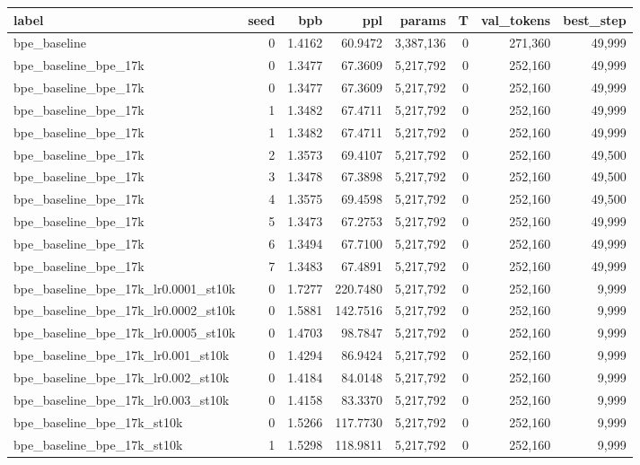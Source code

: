 \begin{tabular}{lrrrrrrr}
\toprule
label & seed & bpb & ppl & params & T & val_tokens & best_step \\
\midrule
bpe\_baseline & 0 & 1.4162 & 60.9472 & 3,387,136 & 0 & 271,360 & 49,999 \\
bpe\_baseline\_bpe\_17k & 0 & 1.3477 & 67.3609 & 5,217,792 & 0 & 252,160 & 49,999 \\
bpe\_baseline\_bpe\_17k & 0 & 1.3477 & 67.3609 & 5,217,792 & 0 & 252,160 & 49,999 \\
bpe\_baseline\_bpe\_17k & 1 & 1.3482 & 67.4711 & 5,217,792 & 0 & 252,160 & 49,999 \\
bpe\_baseline\_bpe\_17k & 1 & 1.3482 & 67.4711 & 5,217,792 & 0 & 252,160 & 49,999 \\
bpe\_baseline\_bpe\_17k & 2 & 1.3573 & 69.4107 & 5,217,792 & 0 & 252,160 & 49,500 \\
bpe\_baseline\_bpe\_17k & 3 & 1.3478 & 67.3898 & 5,217,792 & 0 & 252,160 & 49,500 \\
bpe\_baseline\_bpe\_17k & 4 & 1.3575 & 69.4598 & 5,217,792 & 0 & 252,160 & 49,500 \\
bpe\_baseline\_bpe\_17k & 5 & 1.3473 & 67.2753 & 5,217,792 & 0 & 252,160 & 49,999 \\
bpe\_baseline\_bpe\_17k & 6 & 1.3494 & 67.7100 & 5,217,792 & 0 & 252,160 & 49,999 \\
bpe\_baseline\_bpe\_17k & 7 & 1.3483 & 67.4891 & 5,217,792 & 0 & 252,160 & 49,999 \\
bpe\_baseline\_bpe\_17k\_lr0.0001\_st10k & 0 & 1.7277 & 220.7480 & 5,217,792 & 0 & 252,160 & 9,999 \\
bpe\_baseline\_bpe\_17k\_lr0.0002\_st10k & 0 & 1.5881 & 142.7516 & 5,217,792 & 0 & 252,160 & 9,999 \\
bpe\_baseline\_bpe\_17k\_lr0.0005\_st10k & 0 & 1.4703 & 98.7847 & 5,217,792 & 0 & 252,160 & 9,999 \\
bpe\_baseline\_bpe\_17k\_lr0.001\_st10k & 0 & 1.4294 & 86.9424 & 5,217,792 & 0 & 252,160 & 9,999 \\
bpe\_baseline\_bpe\_17k\_lr0.002\_st10k & 0 & 1.4184 & 84.0148 & 5,217,792 & 0 & 252,160 & 9,999 \\
bpe\_baseline\_bpe\_17k\_lr0.003\_st10k & 0 & 1.4158 & 83.3370 & 5,217,792 & 0 & 252,160 & 9,999 \\
bpe\_baseline\_bpe\_17k\_st10k & 0 & 1.5266 & 117.7730 & 5,217,792 & 0 & 252,160 & 9,999 \\
bpe\_baseline\_bpe\_17k\_st10k & 1 & 1.5298 & 118.9811 & 5,217,792 & 0 & 252,160 & 9,999 \\

\end{tabular}
